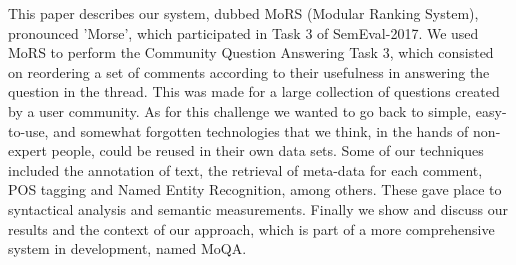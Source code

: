 This paper describes our system, dubbed MoRS (Modular Ranking System), pronounced 'Morse', which participated in Task 3 of SemEval-2017. We used MoRS to perform the Community Question Answering Task 3, which consisted on reordering a set of comments according to their usefulness in answering the question in the thread. This was made for a large collection of questions created by a user community. As for this challenge we wanted to go back to simple, easy-to-use, and somewhat forgotten technologies that we think, in the hands of non-expert people, could be reused in their own data sets. Some of our techniques included the annotation of text, the retrieval of meta-data for each comment, POS tagging and Named Entity Recognition, among others. These gave place to syntactical analysis and semantic measurements. Finally we show and discuss our results and the context of our approach, which is part of a more comprehensive system in development, named MoQA.
